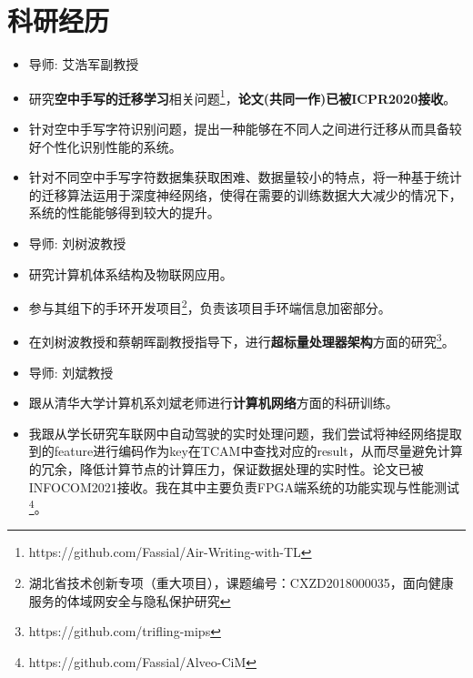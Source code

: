 \documentclass{resume}
\begin{document}
\section{{\bfseries 科研经历}}
\begin{itemize}[parsep=0.2ex]
	\item 导师: 艾浩军副教授
	\item 研究\textbf{空中手写的迁移学习}相关问题\footnote{https://github.com/Fassial/Air-Writing-with-TL}，\textbf{论文(共同一作)已被ICPR2020接收}。
	\item 针对空中手写字符识别问题，提出一种能够在不同人之间进行迁移从而具备较好个性化识别性能的系统。
	\item 针对不同空中手写字符数据集获取困难、数据量较小的特点，将一种基于统计的迁移算法运用于深度神经网络，使得在需要的训练数据大大减少的情况下，系统的性能能够得到较大的提升。
\end{itemize}
\begin{itemize}[parsep=0.2ex]
    \item 导师: 刘树波教授
    \item 研究计算机体系结构及物联网应用。
    \item 参与其组下的手环开发项目\footnote{湖北省技术创新专项（重大项目），课题编号：CXZD2018000035，面向健康服务的体域网安全与隐私保护研究}，负责该项目手环端信息加密部分。
    \item 在刘树波教授和蔡朝晖副教授指导下，进行\textbf{超标量处理器架构}方面的研究\footnote{https://github.com/trifling-mips}。
\end{itemize}
\begin{itemize}[parsep=0.2ex]
    \item 导师: 刘斌教授
    \item 跟从清华大学计算机系刘斌老师进行\textbf{计算机网络}方面的科研训练。
    \item 我跟从学长研究车联网中自动驾驶的实时处理问题，我们尝试将神经网络提取到的feature进行编码作为key在TCAM中查找对应的result，从而尽量避免计算的冗余，降低计算节点的计算压力，保证数据处理的实时性。论文已被INFOCOM2021接收。我在其中主要负责FPGA端系统的功能实现与性能测试\footnote{https://github.com/Fassial/Alveo-CiM}。
\end{itemize}
\end{document}
